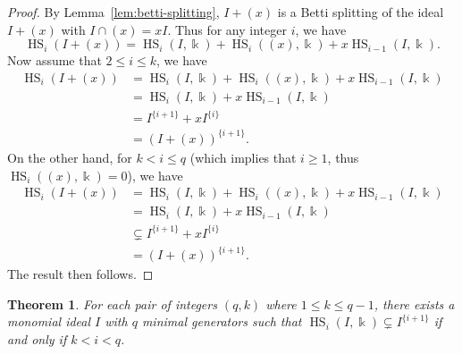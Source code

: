 \documentclass[reqno]{amsart}
\DeclareMathOperator{\HS}{HS}
\newtheorem{theorem}{Theorem}[section]
\theoremstyle{definition}
\theoremstyle{remark}
\numberwithin{equation}{section}
\begin{document}
\begin{proof}
    By Lemma~\ref{lem:betti-splitting}, $I+(x)$ is a Betti splitting of the ideal $I+(x)$ with $I\cap (x)=xI$. Thus for any integer $i$, we have
    \[
    \HS_i(I+(x))= \HS_i(I,\Bbbk) + \HS_i((x),\Bbbk)+ x\HS_{i-1}(I,\Bbbk).
    \]
    Now assume that $2\leq i\leq k$, we have
    \begin{align*}
        \HS_i(I+(x))&= \HS_i(I,\Bbbk) + \HS_i((x),\Bbbk)+ x\HS_{i-1}(I,\Bbbk)\\
        &=\HS_i(I,\Bbbk)+ x\HS_{i-1}(I,\Bbbk)\\
        &=I^{\{i+1\}} +xI^{\{i\}}\\
        &=(I+(x))^{\{i+1\}}.
    \end{align*}
    On the other hand, for $k<i\leq q$ (which implies that $i\geq 1$, thus $\HS_i((x),\Bbbk)=0$), we have
    \begin{align*}
        \HS_i(I+(x))&= \HS_i(I,\Bbbk) + \HS_i((x),\Bbbk)+ x\HS_{i-1}(I,\Bbbk)\\
        &=\HS_i(I,\Bbbk)+ x\HS_{i-1}(I,\Bbbk)\\
        &\subsetneq I^{\{i+1\}} +xI^{\{i\}}\\
        &= (I+(x))^{\{i+1\}}.
    \end{align*}
    The result then follows.
\end{proof}

\begin{theorem}
    For each pair of integers $(q,k)$ where $1\leq k\leq q-1$, there exists a monomial ideal $I$ with $q$ minimal generators such that $\HS_i(I,\Bbbk)\subsetneq I^{\{i+        1\}}$ if and only if $k<i<q$.
\end{theorem}
\end{document}

